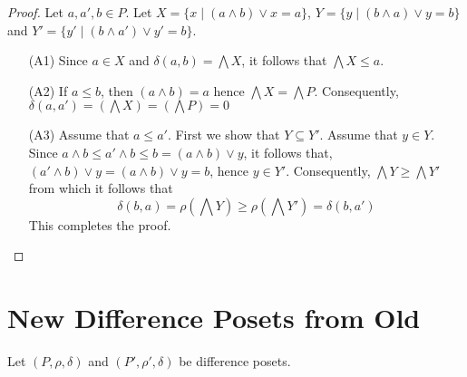\documentclass[acmsmall,review,anonymous]{acmart}\settopmatter{printfolios=true,printccs=false,printacmref=false}
\begin{document}
\begin{proof}
Let $a, a', b \in P$.  Let $X = \{x \; | \; (a \wedge b) \vee x =  a\}$, $Y =
\{y \; | \; (b \wedge a) \vee y = b\}$ and $Y' = \{y' \; | \; (b \wedge a')
\vee y' = b\}$.
\begin{enumerate}
  \item[(A1)]
  Since $a \in X$ and $\delta(a, b) = \bigwedge X$, it follows that
  $\bigwedge X \leq a$.
  \item[(A2)]
  If $a \leq b$, then $(a \wedge b) = a$ hence $\bigwedge X = \bigwedge P$.
  Consequently, $\delta(a, a') = \left(\bigwedge X\right) =
  \left(\bigwedge P \right) = 0$
  \item[(A3)]
  Assume that $a \leq a'$. First we show that $Y \subseteq Y'$. Assume that
  $y \in Y$. Since $a \wedge b \leq a' \wedge b \leq b = (a \wedge b) \vee y$,
  it follows that, $(a' \wedge b) \vee y = (a \wedge b) \vee y = b$, hence $y
  \in Y'$. Consequently, $\bigwedge Y \geq \bigwedge Y'$ from which it follows
  that $$\delta(b, a) =\rho\left(\bigwedge Y\right) \geq
  \rho\left(\bigwedge Y'\right) = \delta(b, a')$$
  This completes the proof.
\end{enumerate}
\end{proof}

\section{New Difference Posets from Old}
Let $(P, \rho, \delta)$ and $(P', \rho', \delta)$ be difference posets.
\end{document}
